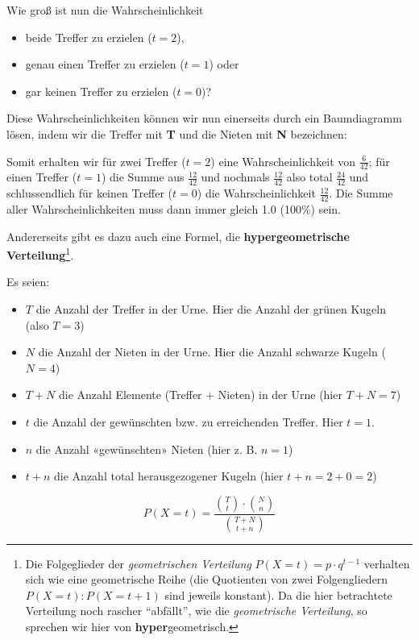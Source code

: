 
Wie groß ist nun die Wahrscheinlichkeit
\begin{itemize}
\item beide Treffer zu erzielen ($t=2$),
\item genau einen Treffer zu erzielen ($t=1$) oder
\item gar keinen Treffer zu erzielen ($t=0$)?
\end{itemize}

Diese Wahrscheinlichkeiten können wir nun einerseits durch ein Baumdiagramm lösen, indem wir die Treffer mit \textbf{\color{green}T} und die Nieten mit \textbf{\color{red}N} bezeichnen:


Somit erhalten wir für zwei Treffer ($t=2$) eine Wahrscheinlichkeit von $\frac{6}{42}$; für einen Treffer ($t=1$) die Summe aus $\frac{12}{42}$ und nochmals $\frac{12}{42}$ also total $\frac{24}{42}$ und schlussendlich für keinen Treffer ($t=0$) die Wahrscheinlichkeit $\frac{12}{42}$.
Die Summe aller Wahrscheinlichkeiten muss dann immer gleich 1.0 (100\%) sein.
\newpage

Andererseits gibt es dazu auch eine Formel, die \textbf{hypergeometrische Verteilung}\footnote{Die Folgeglieder der \textit{geometrischen Verteilung} $P(X=t) = p\cdot{}q^{t-1}$ verhalten sich wie eine geometrische Reihe (die Quotienten von zwei Folgengliedern $P(X=t) : P(X=t+1)$ sind jeweils konstant). Da die hier betrachtete Verteilung noch rascher ``abfällt'', wie die \textit{geometrische Verteilung}, so sprechen wir hier von \textbf{hyper}geometrisch.}.

Es seien:
\begin{itemize}
\item $T$ die Anzahl der Treffer in der Urne. Hier die Anzahl der grünen Kugeln (also $T = 3$)
\item $N$ die Anzahl der Nieten in der Urne. Hier die Anzahl schwarze Kugeln ($N=4$)
\item $T+N$ die Anzahl Elemente (Treffer + Nieten) in der Urne (hier $T+N = 7$)

\item $t$ die Anzahl der gewünschten bzw. zu erreichenden Treffer. Hier \zB $t=1$.
  
\item $n$ die Anzahl «gewünschten» Nieten (hier z. B. $n = 1$)
\item $t+n$ die Anzahl total herausgezogener Kugeln (hier $t+n=2+0=2$)
\end{itemize}
\begin{gesetz}{}{}
$$P(X=t) = \frac{ {T\choose t} \cdot{} {{N}\choose {n}}}{{{T+N} \choose {t+n}}}$$
\end{gesetz}

